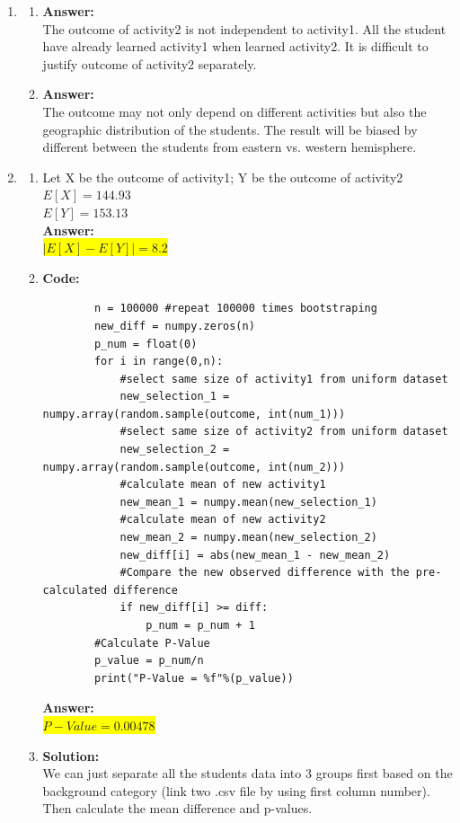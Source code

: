 \documentclass{article}
\newcommand{\myansw}{\textbf{Answer:}\\}
\newcommand{\mysolu}{\textbf{Solution:}\\}
\begin{document}
\begin{enumerate}
\begin{enumerate}
	\end{enumerate}
	\item
	\begin{enumerate}
		\item
		\myansw
		The outcome of activity2 is not independent to activity1. All the student have already learned activity1 when learned activity2. It is difficult to justify outcome of activity2 separately.\\
		\item
		\myansw
		The outcome may not only depend on different activities but also the geographic distribution of the students. The result will be biased by different between the students from eastern vs. western hemisphere.\\
	\end{enumerate}
	\item
	\begin{enumerate}
		\item 
		Let X be the outcome of activity1; Y be the outcome of activity2\\
		$E[X] =144.93 $\\
		$E[Y] = 153.13$\\
		\myansw
		\colorbox{yellow}{$|E[X]-E[Y]| = 8.2$}\\
		\item
		\textbf{Code:}\\
		\begin{verbatim}
		n = 100000 #repeat 100000 times bootstraping
		new_diff = numpy.zeros(n)
		p_num = float(0)
		for i in range(0,n):
		    #select same size of activity1 from uniform dataset
		    new_selection_1 = numpy.array(random.sample(outcome, int(num_1)))
		    #select same size of activity2 from uniform dataset
		    new_selection_2 = numpy.array(random.sample(outcome, int(num_2)))
		    #calculate mean of new activity1
		    new_mean_1 = numpy.mean(new_selection_1)
		    #calculate mean of new activity2
		    new_mean_2 = numpy.mean(new_selection_2)
		    new_diff[i] = abs(new_mean_1 - new_mean_2)
		    #Compare the new observed difference with the pre-calculated difference
		    if new_diff[i] >= diff:
		        p_num = p_num + 1
		#Calculate P-Value
		p_value = p_num/n
		print("P-Value = %f"%(p_value))
		\end{verbatim}
		\myansw
		\colorbox{yellow}{$P-Value = 0.00478$}\\
		\item
		\mysolu
		We can just separate all the students data into 3 groups first based on the background category (link two .csv file by using first column number). Then calculate the mean difference and p-values.\\

\end{enumerate}
\end{enumerate}
\end{document}
